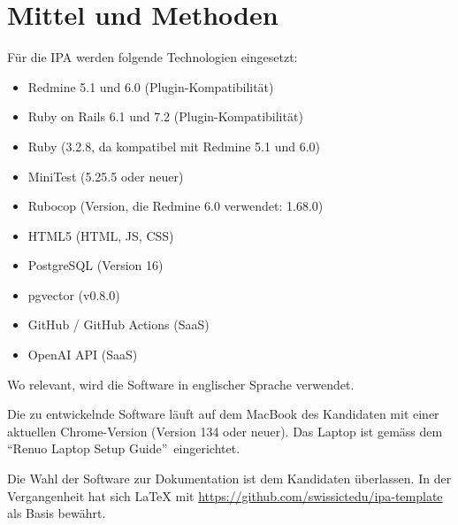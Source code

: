 \section{Mittel und Methoden}

Für die IPA werden folgende Technologien eingesetzt:

\begin{itemize}
    \item Redmine 5.1 und 6.0 (Plugin-Kompatibilität)
    \item Ruby on Rails 6.1 und 7.2 (Plugin-Kompatibilität)
    \item Ruby (3.2.8, da kompatibel mit Redmine 5.1 und 6.0)
    \item MiniTest (5.25.5 oder neuer)
    \item Rubocop (Version, die Redmine 6.0 verwendet: 1.68.0)
    \item HTML5 (HTML, JS, CSS)
    \item PostgreSQL (Version 16)
    \item pgvector (v0.8.0)
    \item GitHub / GitHub Actions (SaaS)
    \item OpenAI API (SaaS)
\end{itemize}

Wo relevant, wird die Software in englischer Sprache verwendet.

Die zu entwickelnde Software läuft auf dem MacBook des Kandidaten mit einer aktuellen Chrome-Version (Version 134 oder neuer). Das Laptop ist gemäss dem \textquotedblleft Renuo Laptop Setup Guide\textquotedblright\ eingerichtet.

Die Wahl der Software zur Dokumentation ist dem Kandidaten überlassen. In der Vergangenheit hat sich LaTeX mit \url{https://github.com/swissictedu/ipa-template} als Basis bewährt.

